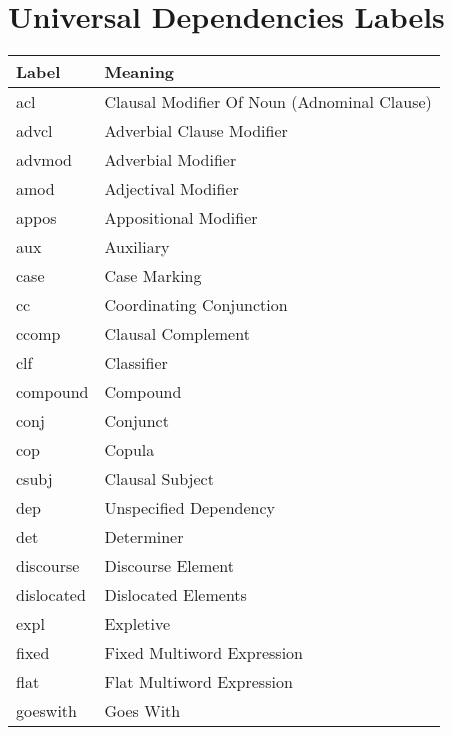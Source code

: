 \chapter{Universal Dependencies Labels} \label{ud_labels}
\begin{longtable}{| p{} | p{} |}
            \hline
            \textbf{Label} & \textbf{Meaning} \\
            \hline
            acl & Clausal Modifier Of Noun (Adnominal Clause) \\
            \hline
            advcl & Adverbial Clause Modifier \\
            \hline
            advmod & Adverbial Modifier \\
            \hline
            amod & Adjectival Modifier \\
            \hline
            appos & Appositional Modifier \\
            \hline
            aux & Auxiliary \\
            \hline
            case & Case Marking \\
            \hline
            cc & Coordinating Conjunction \\
            \hline
            ccomp & Clausal Complement \\
            \hline
            clf & Classifier \\
            \hline
            compound & Compound \\
            \hline
            conj & Conjunct \\
            \hline
            cop & Copula \\
            \hline
            csubj & Clausal Subject \\
            \hline
            dep & Unspecified Dependency \\
            \hline
            det & Determiner \\
            \hline
            discourse & Discourse Element \\
            \hline
            dislocated & Dislocated Elements \\
            \hline
            expl & Expletive \\
            \hline
            fixed & Fixed Multiword Expression \\
            \hline
            flat & Flat Multiword Expression \\
            \hline
            goeswith & Goes With \\

\end{longtable}
